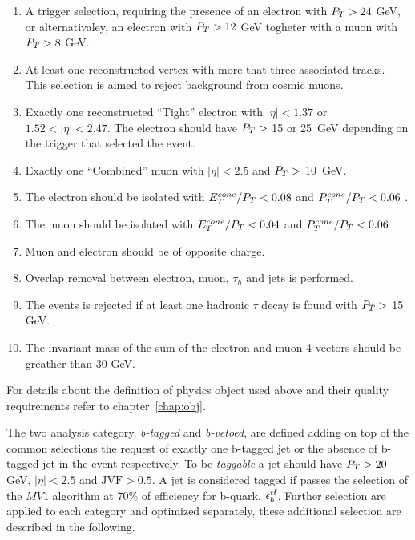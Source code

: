 \begin{enumerate}[label=(\roman*)]
\item A trigger selection, requiring the presence of an electron with $P_{T} > 24$ GeV, or alternativaley,
	an electron with  $P_{T} > 12$ GeV togheter with a muon with  $P_{T} > 8$ GeV. 

\item At least one reconstructed vertex with more that three associated tracks. This selection is aimed to 
	reject background from cosmic muons.

\item Exactly one reconstructed ``Tight'' electron with $|\eta| < 1.37 $ or $1.52 < |\eta| < 2.47$.
	The electron  should have $P_{T} > $ 15 or 25~GeV depending on the trigger that selected the event. 

\item Exactly one ``Combined'' muon with $|\eta| < 2.5$ and  $P_{T} > $ 10~GeV.

\item The electron should be isolated with $E_T^{cone}/P_{T} < 0.08$ and $P_T^{cone}/P_{T} < 0.06$ .

\item The muon should be isolated with  $E_T^{cone}/P_{T} < 0.04$ and $P_T^{cone}/P_{T} <  0.06$ 

\item Muon and electron should be of opposite charge.

\item Overlap removal between electron, muon, $\tau_h$ and jets is performed.

\item The events is rejected if at least one hadronic $\tau$ decay is found with $P_{T} > $ 15 GeV.

\item The invariant mass of the sum of the electron and muon 4-vectors should be greather than 30 GeV.

\end{enumerate}
For details about the definition of physics object used above and their quality requirements  refer to chapter~\ref{chap:obj}.
 
The two analysis category, \emph{b-tagged} and \emph{b-vetoed}, are defined adding on top of the common selections 
the request of exactly one b-tagged jet or the absence of b-tagged jet in the event respectively. To be 
\emph{taggable} a jet should have $P_{T} > 20$ GeV, $|\eta| < 2.5$ and $\text{JVF} > 0.5$.
A jet is considered tagged if passes the selection of the $MV1$ algorithm at 70\% of efficiency for b-quark, 
$\epsilon_b^{t\bar{t}}$. Further selection
are applied to each category and optimized separately, these additional selection are described in the following.

